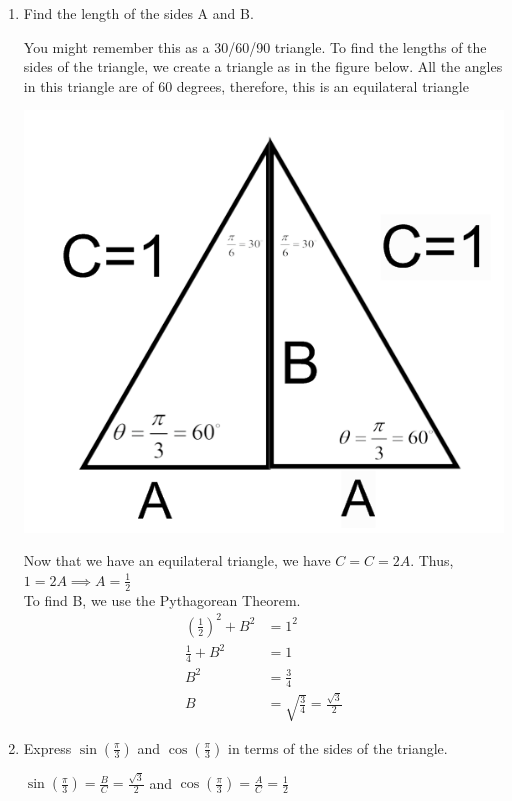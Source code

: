 \documentclass[nooutcomes]{ximera}
\begin{document}
\begin{problem}
\begin{enumerate}
		\begin{enumerate}
	\item Find the length of the sides A and B.
	\begin{freeResponse}
	You might remember this as a 30/60/90 triangle.  To find the lengths of the sides of the triangle, we create a triangle as in the figure below.  All the angles in this triangle are of 60 degrees, therefore, this is an equilateral triangle 
		\begin{image}
		\includegraphics[scale=.5]{figure4.png}
		\end{image}
	Now that we have an equilateral triangle, we have $C=C=2A$.  Thus, $1=2A \implies A=\frac{1}{2}$ \\
	To find B, we use the Pythagorean Theorem.
	\begin{align*}
	\left(\frac{1}{2}\right)^2+B^2&=1^2\\
	\frac{1}{4}+B^2&=1 \\ 	
	B^2&=\frac{3}{4}\\
	B&=\sqrt{\frac{3}{4}}=\frac{\sqrt{3}}{2}
	\end{align*}
	\end{freeResponse}

	\item Express $\sin\left(\frac{\pi}{3}\right)$ and $\cos\left(\frac{\pi}{3}\right)$ in terms of the sides of the triangle.

	\begin{freeResponse}
	$\sin\left(\frac{\pi}{3}\right)=\frac{B}{C}=\frac{\sqrt{3}}{2}$ and $\cos\left(\frac{\pi}{3}\right)=\frac{A}{C}=\frac{1}{2}$


\end{freeResponse}
\end{enumerate}
\end{enumerate}
\end{problem}
\end{document}
